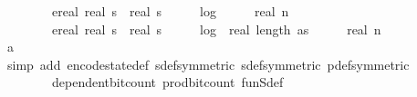 \begin{isabellebody}
\ \ \ \ \ \ \ {\isacharplus}{\kern0pt}\ {\isacharparenleft}{\kern0pt}{\isacharparenleft}{\kern0pt}ereal\ {\isacharparenleft}{\kern0pt}real\ s\ {\isacharasterisk}{\kern0pt}\ real\ s\ {\isacharasterisk}{\kern0pt}\ {\isacharparenleft}{\kern0pt}{}{}\ {\isacharplus}{\kern0pt}\ {}\ {\isacharasterisk}{\kern0pt}\ log\ {}\ {\isacharparenleft}{\kern0pt}{}\ {\isacharplus}{\kern0pt}\ {}\ {\isacharasterisk}{\kern0pt}\ real\ n{\isacharparenright}{\kern0pt}{\isacharparenright}{\kern0pt}\ {\isacharplus}{\kern0pt}\ {}{\isacharparenright}{\kern0pt}\ \isanewline
\ \ \ \ \ \ \ {\isacharplus}{\kern0pt}\ {\isacharparenleft}{\kern0pt}ereal\ {\isacharparenleft}{\kern0pt}real\ s\ {\isacharasterisk}{\kern0pt}\ real\ s\ {\isacharasterisk}{\kern0pt}\ {\isacharparenleft}{\kern0pt}{}\ {\isacharplus}{\kern0pt}\ {}\ {\isacharasterisk}{\kern0pt}\ log\ {}\ {\isacharparenleft}{\kern0pt}real\ {\isacharparenleft}{\kern0pt}length\ as{\isacharparenright}{\kern0pt}\ {\isacharasterisk}{\kern0pt}\ {\isacharparenleft}{\kern0pt}{}\ {\isacharplus}{\kern0pt}\ {}\ {\isacharasterisk}{\kern0pt}\ real\ n{\isacharparenright}{\kern0pt}\ {\isacharplus}{\kern0pt}\ {}{\isacharparenright}{\kern0pt}\ {\isacharparenright}{\kern0pt}\ {\isacharplus}{\kern0pt}\ {}{\isacharparenright}{\kern0pt}{\isacharparenright}{\kern0pt}{\isacharparenright}{\kern0pt}{\isacharparenright}{\kern0pt}{\isachardoublequoteclose}\isanewline
\ \ \ \ \ \ \isamarkupfalse%
\ a{\isacharunderscore}{\kern0pt}{}\isanewline
\ \ \ \ \ \ \isamarkupfalse%
\ {\isacharparenleft}{\kern0pt}simp\ add{\isacharcolon}{\kern0pt}\ encode{\isacharunderscore}{\kern0pt}state{\isacharunderscore}{\kern0pt}def\ sdef{\isacharbrackleft}{\kern0pt}symmetric{\isacharbrackright}{\kern0pt}\ sdef{\isacharbrackleft}{\kern0pt}symmetric{\isacharbrackright}{\kern0pt}\ p{\isacharunderscore}{\kern0pt}def{\isacharbrackleft}{\kern0pt}symmetric{\isacharbrackright}{\kern0pt}\ \isanewline
\ \ \ \ \ \ \ \ dependent{\isacharunderscore}{\kern0pt}bit{\isacharunderscore}{\kern0pt}count\ prod{\isacharunderscore}{\kern0pt}bit{\isacharunderscore}{\kern0pt}count\ fun\isactrlsub S{\isacharunderscore}{\kern0pt}def\isanewline

\end{isabellebody}
